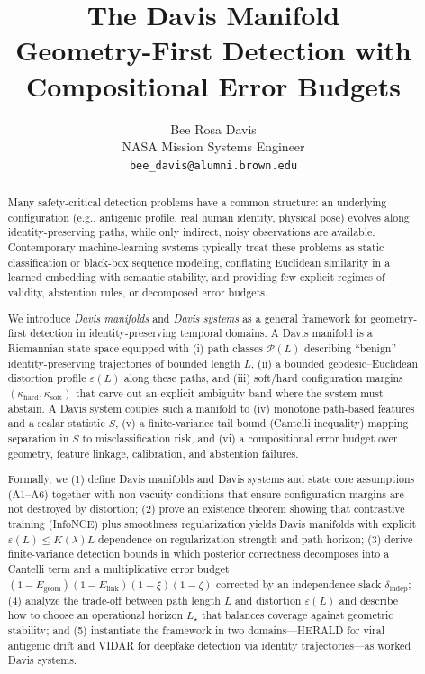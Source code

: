 \documentclass[11pt]{article}
\title{\textbf{The Davis Manifold}\\[0.5ex]
\large Geometry-First Detection with Compositional Error Budgets}
\author{Bee Rosa Davis\\
\small NASA Mission Systems Engineer\\
\small \texttt{bee\_davis@alumni.brown.edu}}
\date{} %
\begin{document}
\maketitle
\vspace{-1.5ex}

\begin{abstract}
Many safety-critical detection problems have a common structure: an underlying configuration
(e.g., antigenic profile, real human identity, physical pose) evolves along identity-preserving
paths, while only indirect, noisy observations are available. Contemporary machine-learning
systems typically treat these problems as static classification or black-box sequence modeling,
conflating Euclidean similarity in a learned embedding with semantic stability, and providing
few explicit regimes of validity, abstention rules, or decomposed error budgets.

We introduce \emph{Davis manifolds} and \emph{Davis systems} as a general framework for
geometry-first detection in identity-preserving temporal domains. A Davis manifold is a
Riemannian state space equipped with (i) path classes $\mathcal{P}(L)$ describing ``benign''
identity-preserving trajectories of bounded length $L$, (ii) a bounded geodesic--Euclidean
distortion profile $\varepsilon(L)$ along these paths, and (iii) soft/hard configuration margins
$(\kappa_{\mathrm{hard}}, \kappa_{\mathrm{soft}})$ that carve out an explicit ambiguity band where the
system must abstain. A Davis system couples such a manifold to (iv) monotone
path-based features and a scalar statistic $S$, (v) a finite-variance tail bound (Cantelli
inequality) mapping separation in $S$ to misclassification risk, and (vi) a compositional
error budget over geometry, feature linkage, calibration, and abstention failures.

Formally, we (1) define Davis manifolds and Davis systems and state core assumptions
(A1--A6) together with non-vacuity conditions that ensure configuration margins are not
destroyed by distortion; (2) prove an existence theorem showing that contrastive training
(InfoNCE) plus smoothness regularization yields Davis manifolds with explicit
$\varepsilon(L) \leq K(\lambda)L$ dependence on regularization strength and path horizon;
(3) derive finite-variance detection bounds in which posterior correctness decomposes into
a Cantelli term and a multiplicative error budget $(1-E_{\text{geom}})(1-E_{\text{link}})
(1-\xi)(1-\zeta)$ corrected by an independence slack $\delta_{\text{indep}}$; (4) analyze the
trade-off between path length $L$ and distortion $\varepsilon(L)$ and describe how to choose
an operational horizon $L_\star$ that balances coverage against geometric stability; and
(5) instantiate the framework in two domains---HERALD for viral antigenic drift and
VIDAR for deepfake detection via identity trajectories---as worked Davis systems.


\end{abstract}
\end{document}
